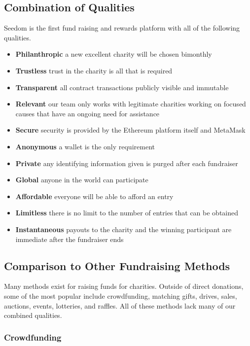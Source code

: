 \documentclass[11pt]{article}
\begin{document}
\subsection{Combination of Qualities}

Seedom is the first fund raising and rewards platform with all of the following qualities.

\begin{itemize}
\item{\textbf{Philanthropic} a new excellent charity will be chosen bimonthly}
\item{\textbf{Trustless} trust in the charity is all that is required}
\item{\textbf{Transparent} all contract transactions publicly visible and immutable}
\item{\textbf{Relevant} our team only works with legitimate charities working on focused causes that have an ongoing need for assistance}
\item{\textbf{Secure} security is provided by the Ethereum platform itself and MetaMask}
\item{\textbf{Anonymous} a wallet is the only requirement}
\item{\textbf{Private} any identifying information given is purged after each fundraiser}
\item{\textbf{Global} anyone in the world can participate}
\item{\textbf{Affordable} everyone will be able to afford an entry}
\item{\textbf{Limitless} there is no limit to the number of entries that can be obtained}
\item{\textbf{Instantaneous} payouts to the charity and the winning participant are immediate after the fundraiser ends}
\end{itemize}

\subsection{Comparison to Other Fundraising Methods}

Many methods exist for raising funds for charities. Outside of direct donations, some of the most popular include crowdfunding, matching gifts, drives, sales, auctions, events, lotteries, and raffles. All of these methods lack many of our combined qualities.

\subsubsection{Crowdfunding}
\end{document}
